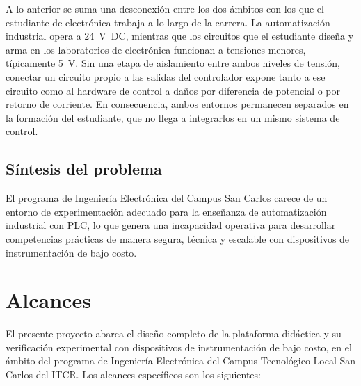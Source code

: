 \documentclass[12pt,a4paper,oneside]{report}
\begin{document}
A lo anterior se suma una desconexión entre los dos ámbitos con los que el estudiante de electrónica trabaja a lo largo de la carrera. La automatización industrial opera a 24~V~DC, mientras que los circuitos que el estudiante diseña y arma en los laboratorios de electrónica funcionan a tensiones menores, típicamente 5~V. Sin una etapa de aislamiento entre ambos niveles de tensión, conectar un circuito propio a las salidas del controlador expone tanto a ese circuito como al hardware de control a daños por diferencia de potencial o por retorno de corriente. En consecuencia, ambos entornos permanecen separados en la formación del estudiante, que no llega a integrarlos en un mismo sistema de control.

\subsection{Síntesis del problema}

El programa de Ingeniería Electrónica del Campus San Carlos carece de un entorno de experimentación adecuado para la enseñanza de automatización industrial con PLC, lo que genera una incapacidad operativa para desarrollar competencias prácticas de manera segura, técnica y escalable con dispositivos de instrumentación de bajo costo.

\section{Alcances}
\label{sec:alcances}

El presente proyecto abarca el diseño completo de la plataforma didáctica y su verificación
experimental con dispositivos de instrumentación de bajo costo, en el ámbito del programa de
Ingeniería Electrónica del Campus Tecnológico Local San Carlos del ITCR. Los alcances
específicos son los siguientes:
\end{document}
